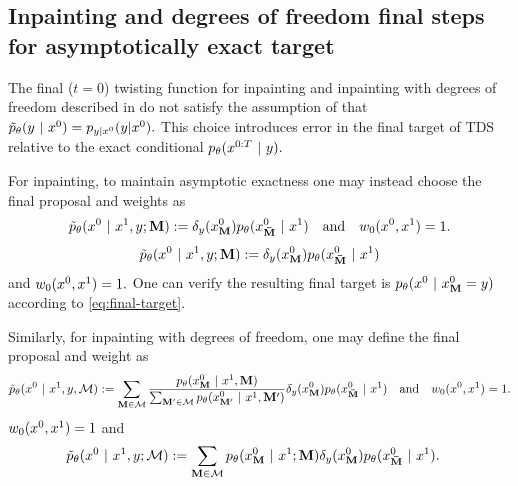 \subsection{Inpainting and degrees of freedom final steps for asymptotically exact target }\label{sec:supp_method_inpaint_alt_final_step}
The final ($t=0$) twisting function for inpainting and inpainting with degrees of freedom described in  do not satisfy the assumption of  that $\tilde p_\theta (y~\vert~ x^{0})=p_{y|x^{0}}({y}|{x^{0}}).$
This choice introduces error in the final target of TDS relative to the exact conditional $p_{\theta}(x^{0:T} ~\vert~ y).$

For inpainting, to maintain asymptotic exactness one may instead choose the final proposal and weights as 
\ifnum{}
\begin{align}\label{eqn:inpaint_final_proposal_and_weight}
    \tilde p_\theta(x^{0} ~\vert~ x^{1}, y; \mathbf{M}) :=  \delta_{y}(x^{0}_{\mathbf{M}})p_{\theta}(x^{0}_{\mathbf{\bar M}} ~\vert~ x^{1}) \quad \mathrm{and} \quad w_0(x^{0}, x^{1}) = 1.
\end{align}
\else
\begin{align}\label{eqn:inpaint_final_proposal_and_weight}
    \tilde p_\theta(x^{0} ~\vert~ x^{1}, y; \mathbf{M}) :=  \delta_{y}(x^{0}_{\mathbf{M}})p_{\theta}(x^{0}_{\mathbf{\bar M}} ~\vert~ x^{1})
\end{align}
and $w_0(x^{0}, x^{1}) = 1.$
\fi
One can verify the resulting final target is $p_{\theta}(x^{0} ~\vert~ x^{0}_{\mathbf{M}} =y)$ according to \cref{eq:final-target}.  

Similarly, for inpainting with degrees of freedom, one may define the final proposal and weight as
\ifnum{}
\begin{equation}
    \tilde p_\theta(x^{0} ~\vert~ x^{1}, y, \mathcal{M}) :=  \sum_{\mathbf{M} \in \mathcal{M}} \frac{p_{\theta}(x^{0}_{\mathbf{M}} ~\vert~ x^{1}, \mathbf{M})}{\sum_{\mathbf{M}^\prime \in \mathcal{M}} p_{\theta}(x^{0}_{\mathbf{M}^\prime} ~\vert~ x^{1}, \mathbf{M}^\prime)
    }
    \delta_{y}(x^{0}_{\mathbf{M}})p_{\theta}(x^{0}_{\mathbf{\bar M}} ~\vert~ x^{1}) 
    \quad \mathrm{and} \quad w_0(x^{0}, x^{1}) = 1.
\end{equation}
\else
$w_0(x^{0}, x^{1}) = 1$ and 
\begin{align*}
\begin{split}
    &\tilde p_\theta(x^{0} ~\vert~ x^{1}, y; \mathcal{M}) :=  \sum_{\mathbf{M} \in \mathcal{M}} p_{\theta}(x^{0}_{\mathbf{M}} ~\vert~ x^{1};\mathbf{M})\delta_{y}(x^{0}_{\mathbf{M}})p_{\theta}(x^{0}_{\mathbf{\bar M}} ~\vert~ x^{1}).
\end{split}
\end{align*}
\fi






